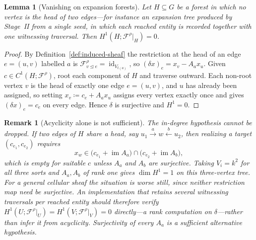 \documentclass[11pt]{article}
\newtheorem{lemma}[definition]{Lemma}
\newtheorem{remark}[definition]{Remark}
\newcommand{\im}{\operatorname{im}}
\newcommand{\id}{\operatorname{id}}
\newcommand{\F}{\mathcal{F}}
\begin{document}
\begin{lemma}[Vanishing on expansion forests]
\label{lem:forest-vanishing}
Let $H\subseteq G$ be a forest in which no vertex is the head of two edges---for instance an expansion tree produced by Stage~II from a single seed, in which each reached entity is recorded together with one witnessing traversal. Then $H^1(H;\F^{\rho}|_H)=0$.
\end{lemma}
\begin{proof}
By Definition~\ref{def:induced-sheaf} the restriction at the head of an edge $e=(u,v)$ labelled $a$ is $\F^{\rho}_{v\unlhd e}=\id_{V_{t(a)}}$, so $(\delta x)_e=x_v-A_ax_u$. Given $c\in C^1(H;\F^{\rho})$, root each component of $H$ and traverse outward. Each non-root vertex $v$ is the head of exactly one edge $e=(u,v)$, and $u$ has already been assigned, so setting $x_v\coloneqq c_e+A_ax_u$ assigns every vertex exactly once and gives $(\delta x)_e=c_e$ on every edge. Hence $\delta$ is surjective and $H^1=0$.
\end{proof}

\begin{remark}[Acyclicity alone is not sufficient]
\label{rem:forest-caveat}
The in-degree hypothesis cannot be dropped. If two edges of $H$ share a head, say $u_1\xrightarrow{a}w\xleftarrow{b}u_2$, then realizing a target $(c_{e_1},c_{e_2})$ requires
\[
x_w\in\bigl(c_{e_1}+\im A_a\bigr)\cap\bigl(c_{e_2}+\im A_b\bigr),
\]
which is empty for suitable $c$ unless $A_a$ and $A_b$ are surjective. Taking $V_i=k^2$ for all three sorts and $A_a,A_b$ of rank one gives $\dim H^1=1$ on this three-vertex tree. For a general cellular sheaf the situation is worse still, since neither restriction map need be surjective. An implementation that retains several witnessing traversals per reached entity should therefore verify $H^1(U;\F^{\rho}|_U)=H^1(V;\F^{\rho}|_V)=0$ directly---a rank computation on $\delta$---rather than infer it from acyclicity. Surjectivity of every $A_a$ is a sufficient alternative hypothesis.
\end{remark}
\end{document}
